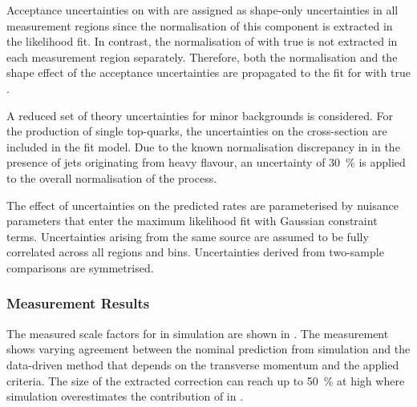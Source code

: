 
Acceptance uncertainties on \ttbar with \faketauhadvis are assigned as
shape-only uncertainties in all measurement regions since the
normalisation of this component is extracted in the likelihood fit.
In contrast, the normalisation of \ttbar with true \tauhadvis is not
extracted in each measurement region separately. Therefore, both the
normalisation and the shape effect of the acceptance uncertainties are
propagated to the fit for \ttbar with true \tauhadvis.

A reduced set of theory uncertainties for minor backgrounds is
considered. For the production of single top-quarks, the uncertainties
on the cross-section are included in the fit model. Due to the known
normalisation discrepancy in \Vjets in the presence of jets
originating from heavy flavour, an uncertainty of \SI{30}{\percent} is
applied to the overall normalisation of the process.

The effect of uncertainties on the predicted rates are parameterised by
nuisance parameters that enter the maximum likelihood fit with
Gaussian constraint terms. Uncertainties arising from the same source
are assumed to be fully correlated across all regions and
bins. Uncertainties derived from two-sample comparisons are
symmetrised.


\subsubsection{Measurement Results}

The measured scale factors for \faketauhadvis in \ttbar simulation are
shown in . The measurement shows varying
agreement between the nominal prediction from simulation and the
data-driven method that depends on the \tauhadvis transverse momentum
and the applied \tauid criteria. The size of the extracted correction
can reach up to \SI{50}{\percent} at high \tauhadvis \pT where
simulation overestimates the contribution of \faketauhadvis in \ttbar.

